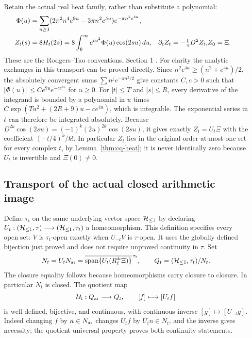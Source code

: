 Retain the actual real heat family, rather than substitute a polynomial:
\begin{align}\label{eq:cq-realheat}
 \Phi(u)&=\sum_{n\geq1}
 (2\pi^2n^4e^{9u}-3\pi n^2e^{5u})e^{-\pi n^2e^{4u}},\notag\\
 Z_t(s)&=8H_t(2s)=8\int_0^\infty e^{tu^2}\Phi(u)\cos(2su)\,du,
 &\partial_tZ_t=-\tfrac14D^2Z_t,
 &Z_0=\Xi.
\end{align}
These are the Rodgers--Tao conventions, Section 1 \cite{rodgersTao2020}.
For clarity the analytic exchanges in this transport can be proved
directly. Since $n^2e^{4u}\geq(n^2+e^{4u})/2$, the absolutely
convergent sums $\sum n^je^{-\pi n^2/2}$ give constants $C,c>0$
such that $|\Phi(u)|\leq Ce^{9u}e^{-ce^{4u}}$ for $u\geq0$.
For $|t|\leq T$ and $|s|\leq R$, every derivative of the integrand
is bounded by a polynomial in $u$ times
$C\exp(Tu^2+(2R+9)u-ce^{4u})$, which is integrable.
The exponential series in $t$ can therefore be integrated absolutely.
Because $D^{2k}\cos(2su)=(-1)^k(2u)^{2k}\cos(2su)$, it gives
exactly $Z_t=U_t\Xi$ with the coefficient $(-t/4)^k/k!$.
In particular $Z_t$ lies in the original order-at-most-one set for
every complex $t$, by Lemma~\ref{thm:cq-heat}; it is never identically
zero because $U_t$ is invertible and $\Xi(0)\ne0$.

\subsection{Transport of the actual closed arithmetic image}
\label{sec:cq-moving}
Define $\tau_t$ on the same underlying vector space $\mathcal H_{\leq 1}$ by
declaring $U_t:(\mathcal H_{\leq 1},\tau)\longrightarrow(\mathcal H_{\leq 1},\tau_t)$ a
homeomorphism. This definition specifies every open set:
$V$ is $\tau_t$-open exactly when $U_{-t}V$ is $\tau$-open.
It uses the globally defined bijection just proved and does not require
unproved continuity in $\tau$. Set
\begin{equation}\label{eq:cq-Qt}
 N_t=U_tN_{\rm ar}
 =\overline{\operatorname{span}\{U_t(R_\ell^\pm\Xi)\}}^{\,\tau_t},
 \qquad Q_t=(\mathcal H_{\leq 1},\tau_t)/N_t.
\end{equation}
The closure equality follows because homeomorphisms carry closure to
closure. In particular $N_t$ is closed. The quotient map
\begin{equation}\label{eq:cq-Phi}
 \mathcal U_t:Q_{\rm ar}\longrightarrow Q_t,\qquad [f]\longmapsto[U_tf]
\end{equation}
is well defined, bijective, and continuous, with continuous inverse
$[g]\mapsto[U_{-t}g]$. Indeed changing $f$ by $n\in N_{\rm ar}$
changes $U_tf$ by $U_tn\in N_t$, and the inverse gives necessity;
the quotient universal property proves both continuity statements.

